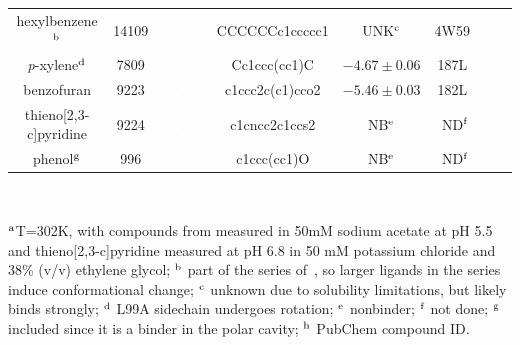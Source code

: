 \documentclass[aps,pre,twocolumn,nofootinbib,superscriptaddress,10pt, final,tightenlines]{revtex4-1}
\begin{document}
\begin{table}
\begin{center}
\begin{tabular}{@{}| c | c | c | c | c | c | c | c@{}}
hexylbenzene$^{\rm b}$ & 14109 & \includegraphics[width=0.04\textwidth]{figures/14109.pdf} & CCCCCCc1ccccc1 & UNK$^{\rm c}$   &    4W59~\cite{merski_homologous_2015}  &   \cite{morton_energetic_1995} \\%
\emph{p}-xylene$^{\rm d}$ & 7809 &  \includegraphics[width=0.04\textwidth]{figures/7809.pdf} & Cc1ccc(cc1)C  & $-4.67\pm0.06$  &   187L~\cite{morton_specificity_1995}  &  \cite{morton_energetic_1995} \\%
benzofuran & 9223  & \includegraphics[width=0.04\textwidth]{figures/9223.pdf} & c1ccc2c(c1)cco2  &  $-5.46\pm0.03$ & 182L~\cite{morton_specificity_1995} & \cite{morton_energetic_1995}\\
thieno[2,3-c]pyridine & 9224 & \includegraphics[width=0.04\textwidth]{figures/9224.pdf} & c1cncc2c1ccs2 & NB$^{\rm e}$ &  ND$^{\rm f}$ & \cite{mobley_predicting_2007} \\        %
phenol$^{\rm g}$ & 996 & \includegraphics[width=0.04\textwidth]{figures/996.pdf} & c1ccc(cc1)O & NB$^{\rm e}$  & ND$^{\rm f}$ & \cite{morton_energetic_1995, mobley_predicting_2007} \\%

\hline
\end{tabular}\\
\end{center}
$^{\rm a}$T=302K, with compounds from \cite{morton_energetic_1995} measured in 50mM sodium acetate at pH 5.5 and thieno[2,3-c]pyridine measured at pH 6.8 in 50 mM potassium chloride and 38\% (v/v) ethylene glycol; $^{\rm b}$ part of the series of~\cite{merski_homologous_2015}, so larger ligands in the series induce conformational change; $^{\rm c}$ unknown due to solubility limitations, but likely binds strongly; $^{\rm d}$ L99A sidechain undergoes rotation; $^{\rm e}$ nonbinder; $^{\rm f}$ not done; $^{\rm g}$ included since it is a binder in the polar cavity; $^{\rm h}$ PubChem compound ID.
\end{table}
\endgroup
\end{document}

